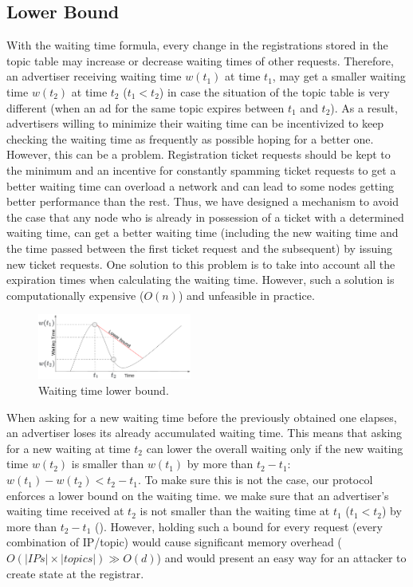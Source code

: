 \subsection{Lower Bound}
With the waiting time formula, every change in the registrations stored in  the topic table may increase or decrease waiting times of other requests. 
Therefore,  an advertiser receiving waiting time $w(t_1)$ at time $t_1$, may get a smaller waiting time $w(t_2)$ at time $t_2$ ($t_1 < t_2$) in case the situation of the topic table is very different (\eg when an ad for the same topic expires between $t_1$ and $t_2$). 
As a result,  advertisers willing to minimize their waiting time can be incentivized to keep checking the waiting time as frequently as possible hoping for a better one.
However, this can be a problem. 
Registration ticket requests should be kept to the minimum and an incentive for constantly spamming ticket requests to get a better waiting time can overload a network and can lead to some nodes getting better performance than the rest.
Thus, we have designed a mechanism to avoid the case that any node who is already in possession of a ticket with a determined waiting time, can get a better waiting time (including the new waiting time and the time passed between the first ticket request and the subsequent) by issuing new ticket requests.
One solution to this problem is to take into account all the expiration times when calculating the waiting time. 
However, such a solution is computationally expensive (\eg $O(n)$) and unfeasible in practice.

\begin{figure}
    \includegraphics[width=0.45\textwidth]{img/lower_bound.png}
    \caption{Waiting time lower bound.}
    \label{fig:lower_bound}
\end{figure}

When asking for a new waiting time before the previously obtained one elapses,
an advertiser loses its already accumulated waiting time. This means that
asking for a new waiting at time $t_2$ can lower the overall waiting only if
the new waiting time $w(t_2)$ is smaller than $w(t_1)$ by more than $t_2 - t_1$: $w(t_1) - w(t_2) < t_2 - t_1$.
To make sure this is not the case, our protocol enforces a lower bound on the
waiting time. \Ie we make sure that an advertiser's waiting time received at
$t_2$ is not smaller than the waiting time at $t_1$ ($t_1 < t_2$) by more than
$t_2 - t_1$ ().
However, holding such a bound for every request (\ie every combination of IP/topic) would cause significant memory overhead ($O(|IPs|\times|topics|)  \gg O(d)$) and would present an easy way for an attacker to create state at the registrar. 

